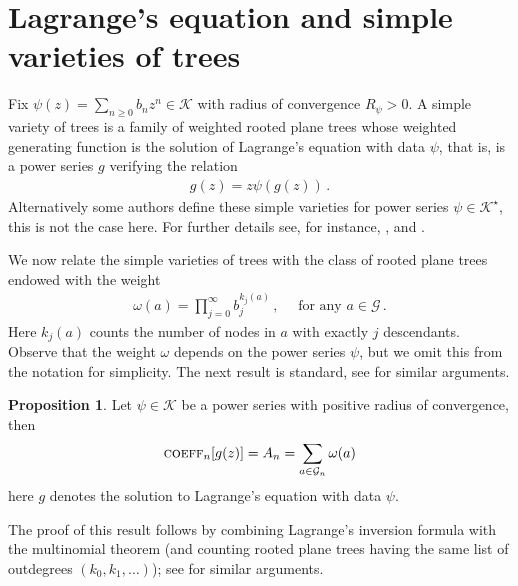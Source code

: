 \documentclass[11pt,a4paper,leqno]{amsart}
\theoremstyle{plain}
\theoremstyle{definition}
\numberwithin{equation}{section}
\newtheorem{propoletra}{Proposition}
\def\K{\mathcal{K}}
\begin{document}
	\section{Lagrange's equation and simple varieties of trees}
	
	Fix $\psi(z) = \sum_{n \geq 0}b_nz^n \in \K$ with radius of convergence $R_{\psi}>0$. A simple variety of trees is a family of weighted rooted plane trees whose weighted generating function is the solution of Lagrange's equation with data $\psi$, that is, is a power series $g$ verifying the relation
	\begin{align*}
		g(z) = z\psi(g(z))\,.
	\end{align*}
	Alternatively some authors define these simple varieties for power series $\psi \in \K^{\star}$, this is not the case here. For further details see, for instance, \cite{Drmota},  \cite[p. 452]{Flajolet} and \cite{Janson2012}. 
	\smallskip
	
	We now relate the simple varieties of trees with the class of rooted plane trees endowed with the weight
	\begin{align}\label{eq:weights}
		\omega(a) = \prod_{j = 0}^{\infty}b_j^{k_j(a)}\,, \quad \text{ for any } a \in \mathcal{G}\,.
	\end{align}
	Here $k_j(a)$ counts the number of nodes in $a$ with exactly $j$ descendants. Observe that the weight $\omega$ depends on the power series $\psi$, but we omit this from the notation for simplicity. The next result is standard, see \cite{Pitman} for similar arguments.
	\begin{propoletra}\label{propo: weights} Let $\psi \in \K$ be a power series with positive radius of convergence, then 
		\begin{align*}
			\textsc{coeff}_n[g(z)] = A_n = \sum_{a \in \mathcal{G}_n}\omega(a)
		\end{align*}
		here $g$ denotes the solution to Lagrange's equation with data $\psi$.
	\end{propoletra}
	
	The proof of this result follows by combining Lagrange’s inversion formula with the multinomial theorem (and counting rooted plane trees having the same list of outdegrees $(k_0,k_1,\dots)$); see \cite{Pitman} for similar arguments.
	\smallskip
	
\end{document}

